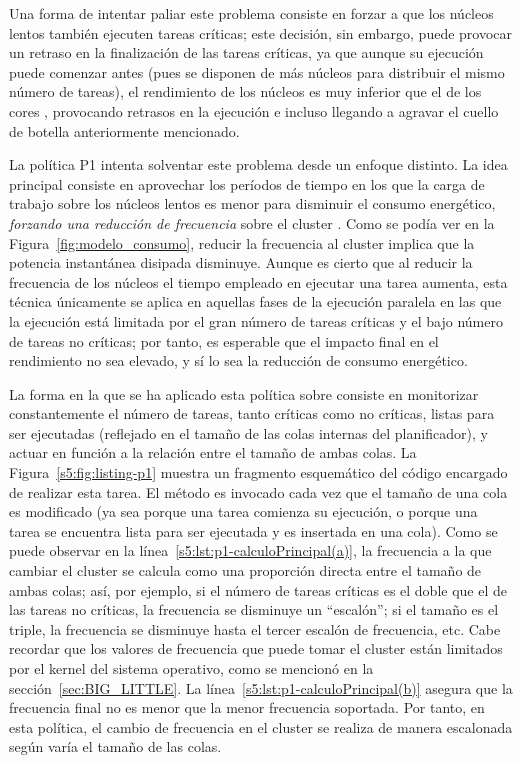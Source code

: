 Una forma de intentar paliar este problema consiste en forzar a que los
núcleos lentos también ejecuten tareas críticas; este decisión, sin embargo, puede provocar 
un retraso en la finalización de las tareas críticas, ya que aunque su ejecución
puede comenzar antes (pues se disponen de más núcleos para distribuir
el mismo número de tareas), el rendimiento de los núcleos \LITTLE es muy
inferior que el de los cores \BIG, provocando retrasos en la ejecución e
incluso llegando a agravar el cuello de botella anteriormente mencionado.

La política P1 intenta solventar este problema desde un enfoque distinto. La
idea principal consiste en aprovechar los períodos de tiempo en los que la carga 
de trabajo sobre los núcleos lentos es menor para disminuir el consumo energético, 
{\em forzando una reducción de frecuencia} sobre el cluster \LITTLE. 
Como se podía ver en la Figura~\ref{fig:modelo_consumo}, reducir la frecuencia al cluster \LITTLE
implica que la potencia instantánea disipada disminuye. Aunque es cierto que al
reducir la frecuencia de los núcleos el tiempo empleado en ejecutar una tarea
aumenta, esta técnica únicamente se aplica en aquellas fases de la ejecución paralela en las que
la ejecución está limitada por el gran número de tareas críticas y el
bajo número de tareas no críticas; por tanto, es esperable que el impacto final en el
rendimiento no sea elevado, y sí lo sea la reducción de consumo energético.

La forma en la que se ha aplicado esta política sobre \botlev
consiste en monitorizar constantemente el número de tareas, tanto críticas
como no críticas, listas para ser ejecutadas (reflejado en el tamaño de las
colas internas del planificador), y actuar en función a la relación entre
el tamaño de ambas colas. La Figura~\ref{s5:fig:listing-p1} muestra un
fragmento esquemático del código encargado de realizar esta tarea. El
método es invocado cada vez que el tamaño de una cola es modificado (ya sea porque
una tarea comienza su ejecución, o porque una tarea se encuentra lista para
ser ejecutada y es insertada en una cola). Como se puede observar en la
línea~\ref{s5:lst:p1-calculoPrincipal(a)}, la frecuencia a la que cambiar
el cluster se calcula como una proporción directa entre el tamaño de ambas
colas; así, por ejemplo, si el número de tareas críticas es el doble que el de las
tareas no críticas, la frecuencia se disminuye un ``escalón''; si el tamaño
es el triple, la frecuencia se disminuye hasta el tercer escalón de
frecuencia, etc. Cabe recordar que los valores de frecuencia que puede tomar el
cluster están limitados por el kernel del sistema operativo, como se
mencionó en la sección~\ref{sec:BIG_LITTLE}. La
línea~\ref{s5:lst:p1-calculoPrincipal(b)} asegura que la frecuencia final
no es menor que la menor frecuencia soportada. Por tanto, en esta política,
el cambio de frecuencia en el cluster se realiza de manera
escalonada según varía el tamaño de las colas.


